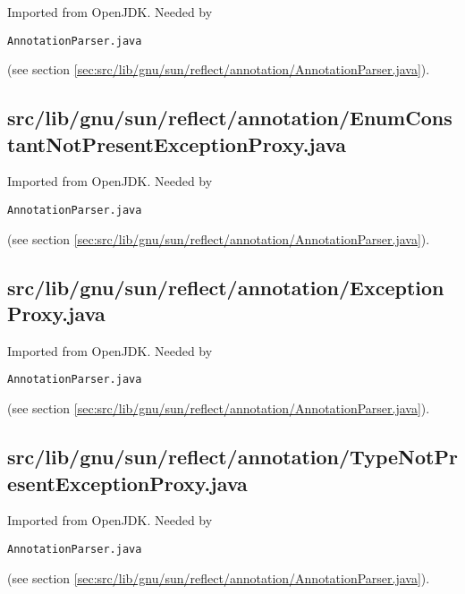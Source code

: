 \documentclass[a4paper, 10pt, titlepage]{scrartcl} %
\begin{document}
Imported from OpenJDK. Needed by \begin{scriptsize}\verb|AnnotationParser|\hspace{0.0pt}\verb|.|\hspace{0.0pt}\verb|java|\end{scriptsize} (see section \ref{sec:src/lib/gnu/sun/reflect/annotation/AnnotationParser.java}).

\subsection{src/lib/gnu/sun/reflect/annotation/EnumConstantNotPresentExceptionProxy.java}
\label{sec:src/lib/gnu/sun/reflect/annotation/EnumConstantNotPresentExceptionProxy.java}

Imported from OpenJDK. Needed by \begin{scriptsize}\verb|AnnotationParser|\hspace{0.0pt}\verb|.|\hspace{0.0pt}\verb|java|\end{scriptsize} (see section \ref{sec:src/lib/gnu/sun/reflect/annotation/AnnotationParser.java}).

\subsection{src/lib/gnu/sun/reflect/annotation/ExceptionProxy.java}
\label{sec:src/lib/gnu/sun/reflect/annotation/ExceptionProxy.java}

Imported from OpenJDK. Needed by \begin{scriptsize}\verb|AnnotationParser|\hspace{0.0pt}\verb|.|\hspace{0.0pt}\verb|java|\end{scriptsize} (see section \ref{sec:src/lib/gnu/sun/reflect/annotation/AnnotationParser.java}).

\subsection{src/lib/gnu/sun/reflect/annotation/TypeNotPresentExceptionProxy.java}
\label{sec:src/lib/gnu/sun/reflect/annotation/TypeNotPresentExceptionProxy.java}

Imported from OpenJDK. Needed by \begin{scriptsize}\verb|AnnotationParser|\hspace{0.0pt}\verb|.|\hspace{0.0pt}\verb|java|\end{scriptsize} (see section \ref{sec:src/lib/gnu/sun/reflect/annotation/AnnotationParser.java}).
\end{document}
